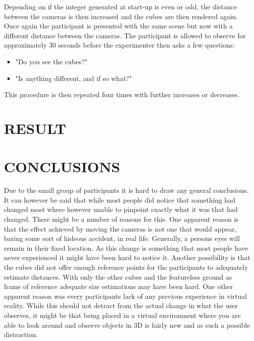 \documentclass[tog]{acmsiggraph}
\begin{document}
Depending on if the integer generated at start-up is even or odd, the distance between the cameras is then increased and the cubes are then rendered again. Once again the participant is presented with the same scene but now with a different distance between the cameras. The participant is allowed to observe for approximately 30 seconds before the experimenter then asks a few questions:
\begin{itemize}  
	
	\item "Do you see the cubes?"
	
	\item "Is anything different, and if so what?"
	 
	
\end{itemize}

This procedure is then repeated four times with further increases or decreases.  


\section{RESULT}


\section{CONCLUSIONS}

Due to the small group of participants it is hard to draw any general conclusions. It can however be said that while most people did notice that something had changed most where however unable to pinpoint exactly what it was that had changed. There might be a number of reasons for this. One apparent reason is that the effect achieved by moving the cameras is not one that would appear, baring some sort of hideous accident, in real life. Generally, a persons eyes will remain in their fixed location. As this change is something that most people have never experienced it might have been hard to notice it. Another possibility is that the cubes did not offer enough reference points for the participants to adequately estimate distances. With only the other cubes and the featureless ground as frame of reference adequate size estimations may have been hard. One other apparent reason was every participants lack of any previous experience in virtual reality. While this should not detract from the actual change in what the user observes, it might be that being placed in a virtual environment where you are able to look around and observe objects in 3D is fairly new and as such a possible distraction.  
\end{document}
